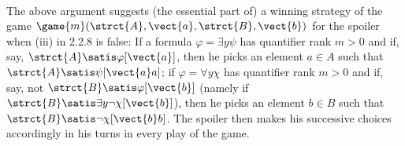 \begin{enumerate}[1.]
\medskip\\
The above argument suggests (the essential part of) a winning strategy of the game $\game{m}(\strct{A}, \vect{a}, \strct{B}, \vect{b})$ for the spoiler when (iii) in 2.2.8 is false: If a formula $\varphi = \exists y \psi$ has quantifier rank $m > 0$ and if, say, $\strct{A} \satis \varphi[\vect{a}]$, then he picks an element $a \in A$ such that $\strct{A} \satis \psi[\vect{a}a]$; if $\varphi = \forall y \chi$ has quantifier rank $m > 0$ and if, say, not $\strct{B} \satis \varphi[\vect{b}]$ (namely if $\strct{B} \satis \exists y \neg\chi[\vect{b}]$), then he picks an element $b \in B$ such that $\strct{B} \satis \neg\chi[\vect{b}b]$. The spoiler then makes his successive choices accordingly in his turns in every play of the game.
%
\end{enumerate}



